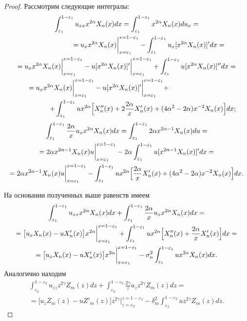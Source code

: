 \begin{proof}
Рассмотрим следующие интегралы:
\begin{multline*}
\int_{\varepsilon_1}^{1-\varepsilon_1}{u_{xx}x^{2\alpha}X_n(x)dx}=\int_{\varepsilon_1}^{1-\varepsilon_1}{x^{2\alpha}X_n(x)du_x}=
\\
\hfill
= u_x x^{2\alpha}X_n(x)\biggr|_{x=\varepsilon_1}^{x=1-\varepsilon_1}-\int_{\varepsilon_1}^{1-\varepsilon_1}{u_x[x^{2\alpha}X_n(x)]^\prime dx}=~~~~~
\\
= 
u_x x^{2\alpha}X_n(x)\biggr|_{x=\varepsilon_1}^{x=1-\varepsilon_1}-
u[x^{2\alpha}X_n(x)]^\prime\biggr|_{x=\varepsilon_1}^{x=1-\varepsilon_1}+\int_{\varepsilon_1}^{1-\varepsilon_1}{u[x^{2\alpha}X_n(x)]^{\prime\prime}dx}=
\\
~~~~~
=
u_x x^{2\alpha}X_n(x)\biggr|_{x=\varepsilon_1}^{x=1-\varepsilon_1}- 
u[x^{2\alpha}X_n(x)]^\prime\biggr|_{x=\varepsilon_1}^{x=1-\varepsilon_1} + \hfill
\\
\hfill
+\int_{\varepsilon_1}^{1-\varepsilon_1}
ux^{2\alpha}\Bigl[X''_n(x)+2\frac{2\alpha}{x}X'_n(x)+(4\alpha^2-2\alpha)x^{-2}X_n(x)\Bigr]dx;
\end{multline*}
\begin{multline*}
\int_{\varepsilon_1}^{1-\varepsilon_1}{\frac{2\alpha}{x}u_x x^{2\alpha} X_n(x)dx}=\int_{\varepsilon_1}^{1-\varepsilon_1}{2\alpha x^{2\alpha-1}X_n(x)du}  =
\\
= 2\alpha x^{2\alpha-1}X_n(x)u\biggr|_{x=\varepsilon_1}^{x=1-\varepsilon_1} -2\alpha\int_{\varepsilon_1}^{1-\varepsilon_1} u[x^{2\alpha-1}X_n(x)]^\prime dx=
\\ 
= 2\alpha x^{2\alpha-1}X_n(x)u \biggr|_{x=\varepsilon_1}^{x=1-\varepsilon_1}-
\int_{\varepsilon_1}^{1-\varepsilon_1} ux^{2\alpha}\Bigl[\frac{2\alpha}{x}X'_n(x)+(4\alpha^2-2\alpha)x^{-2}X_n(x)\Bigr]dx.
\end{multline*}

	На основании полученных выше равенств имеем
\begin{multline}
\int_{\varepsilon_1}^{1-\varepsilon_1}{u_{xx}x^{2\alpha}X_n(x)dx+\int_{\varepsilon_1}^{1-\varepsilon_1}{\frac{2\alpha}{x}u_x x^{2\alpha}X_n(x)dx}}=
\\
= \bigl[u_x X_n(x)-uX'_n(x)\bigr]x^{2\alpha}\biggr|_{x=\varepsilon_1}^{x=1-\varepsilon_1}+
\int_{\varepsilon_1}^{1-\varepsilon_1}ux^{2\alpha}\Bigl[X''_n(x)+\frac{2\alpha}{x}X'_n(x)\Bigr]dx=
\\
= \bigl[u_x X_n(x)-uX'_n(x)\bigr]x^{2\alpha} \biggr|_{x=\varepsilon_1}^{x=1-\varepsilon_1}-
\sigma_n^2\int_{\varepsilon_1}^{1-\varepsilon_1} ux^{2\alpha} X_n(x)dx .
\label{eq:k30}
\end{multline}
Аналогично находим
\begin{multline}
\int_{\varepsilon_2}^{1-\varepsilon_2}
u_{zz} z^{2\gamma}Z_m(z)dz+\int_{\varepsilon_2}^{1-\varepsilon_2} 
\frac{2\gamma}{z}u_z z^{2\gamma}Z_m(z)dz=
\\
= \bigl[u_z Z_m(z)-uZ'_m(z)\bigr]z^{2\gamma}\biggr|_{z=\varepsilon_2}^{z=1-\varepsilon_2}-
\delta_m^2\int_{\varepsilon_2}^{1-\varepsilon_2}uz^{2\gamma}Z_m(z)dz .
\label{eq:k31}
\end{multline}


\end{proof}
